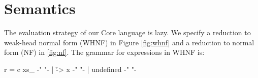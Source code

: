 \begin{comment}
\subsubsection{The |split| operation}

\begin{figure}
\begin{tabular}{rcl}
|split(v)| & |=| & |(v, [])| \\
|split(c)| & |=| & |(c, [])| \\
|split(f)| & |=| & |(f, [])| \\
|split(x ys_)| & |=| & |(bullet {-"\text{ } \overline{\bullet} "-}, x:ys_)| \\
|split(\vs_ -> x)| & |=| & |(\vs_ -> bullet, x)| \\
|split(let v = x in y)| & |=| & |(let v = bullet in bullet, [x,y])| \\
|split(case x of {p_1 \! -> \! y_1 ; ... ; p_n \! -> \! y_n})| & |=| & |(case {-"\hspace{-1mm}"-} bullet {-"\hspace{-1mm}"-} of {p_1 \! -> \! bullet ; ... ; p_n \! -> \! bullet}, [x, y_1, ... ,y_n])|
\end{tabular}
\caption{The |split| function, returning a spine and all subexpressions.}
\label{fig:split}
\end{figure}

We define the |split| function in Figure \ref{fig:split}, which splits an expression into a pair of its spine and its immediate subexpressions. The $\bullet$ markers in the spine indicate the positions from which subexpressions have been removed. We define the |join| operation to be the inverse of |split|, taking a spine and a list of expressions, and producing an expression.
\end{comment}


\section{Semantics}
\label{sec:semantics}

The evaluation strategy of our Core language is lazy. We specify a reduction to weak-head normal form (WHNF) in Figure \ref{fig:whnf} and a reduction to normal form (NF) in \ref{fig:nf}. The grammar for expressions in WHNF is:

\begin{code}
r  =  c \< xs_ \>  {-"  "-}
   |  \v -> x      {-"  "-}
   |  undefined    {-"  "-}
\end{code}

